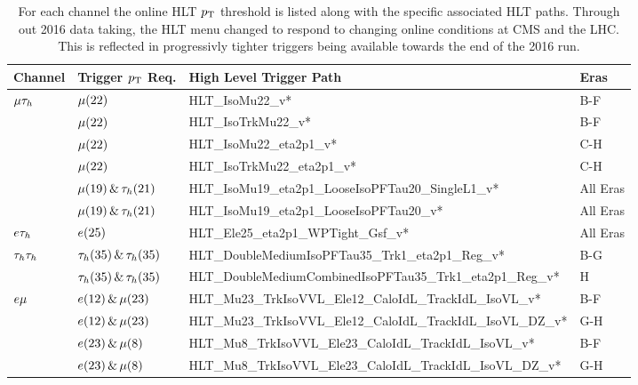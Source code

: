 \begin{table}[htbp]
\centering
\begin{footnotesize}
\begin{tabular}{|l|l|l|l|}
\hline
  Channel           &         Trigger $p_\mathrm{T}$ Req.              &     High Level Trigger Path  &   Eras  \\
\hline
  $\mu\tau_{h}$       &         $\mu(22)$                     &  \scriptsize{HLT\_IsoMu22\_v*} & B-F  \\ 
                   &         $\mu(22)$                     &  \scriptsize{HLT\_IsoTrkMu22\_v*} & B-F   \\ 
                   &         $\mu(22)$                     &  \scriptsize{HLT\_IsoMu22\_eta2p1\_v*} & C-H  \\
                   &         $\mu(22)$                     &  \scriptsize{HLT\_IsoTrkMu22\_eta2p1\_v*} & C-H   \\
                   &         $\mu(19)\,\&\,\tau_{h} (21)$     &  \scriptsize{HLT\_IsoMu19\_eta2p1\_LooseIsoPFTau20\_SingleL1\_v*} &  All Eras  \\
                   &         $\mu(19)\,\&\,\tau_{h} (21)$     &  \scriptsize{HLT\_IsoMu19\_eta2p1\_LooseIsoPFTau20\_v*} &  All Eras \\
\hline
  $e\tau_{h}$       &         $e (25)$                     &  \scriptsize{HLT\_Ele25\_eta2p1\_WPTight\_Gsf\_v*}   & All Eras \\
\hline
 $\tau_{h}\tau_{h}$      &         $\tau_{h} (35)\,\&\,\tau_{h} (35)$   &  \scriptsize{HLT\_DoubleMediumIsoPFTau35\_Trk1\_eta2p1\_Reg\_v*} & B-G   \\ 
                   &         $\tau_{h} (35)\,\&\,\tau_{h} (35)$   &  \scriptsize{HLT\_DoubleMediumCombinedIsoPFTau35\_Trk1\_eta2p1\_Reg\_v*} & H  \\
\hline
  $e\mu$        &         $e(12)\,\&\,\mu (23)$       &  \scriptsize{HLT\_Mu23\_TrkIsoVVL\_Ele12\_CaloIdL\_TrackIdL\_IsoVL\_v*} & B-F \\
                   &         $e(12)\,\&\,\mu (23)$       &  \scriptsize{HLT\_Mu23\_TrkIsoVVL\_Ele12\_CaloIdL\_TrackIdL\_IsoVL\_DZ\_v*} & G-H  \\
                   &         $e(23)\,\&\,\mu (8)$        &  \scriptsize{HLT\_Mu8\_TrkIsoVVL\_Ele23\_CaloIdL\_TrackIdL\_IsoVL\_v*} & B-F  \\
                   &         $e(23)\,\&\,\mu (8)$        &  \scriptsize{HLT\_Mu8\_TrkIsoVVL\_Ele23\_CaloIdL\_TrackIdL\_IsoVL\_DZ\_v*} & G-H  \\
\hline
\end{tabular}
\end{footnotesize}
\caption{For each channel the online HLT $p_\mathrm{T}$ threshold is listed along with the specific associated
HLT paths.  Through out 2016 data taking, the HLT menu changed to respond to changing online
conditions at CMS and the LHC.  This is reflected in progressivly tighter triggers
being available towards the end of the 2016 run.
\label{tab:htt_hlt_triggers}
}
\end{table}



